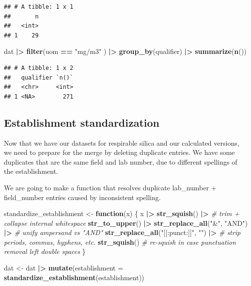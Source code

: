 \documentclass[
]{article}
\newenvironment{Shaded}{\begin{snugshade}}{\end{snugshade}}
\newcommand{\AttributeTok}[1]{\textcolor[rgb]{0.13,0.29,0.53}{#1}}
\newcommand{\CommentTok}[1]{\textcolor[rgb]{0.56,0.35,0.01}{\textit{#1}}}
\newcommand{\ControlFlowTok}[1]{\textcolor[rgb]{0.13,0.29,0.53}{\textbf{#1}}}
\newcommand{\FunctionTok}[1]{\textcolor[rgb]{0.13,0.29,0.53}{\textbf{#1}}}
\newcommand{\NormalTok}[1]{#1}
\newcommand{\OtherTok}[1]{\textcolor[rgb]{0.56,0.35,0.01}{#1}}
\newcommand{\SpecialCharTok}[1]{\textcolor[rgb]{0.81,0.36,0.00}{\textbf{#1}}}
\newcommand{\StringTok}[1]{\textcolor[rgb]{0.31,0.60,0.02}{#1}}
\begin{document}
\begin{verbatim}
## # A tibble: 1 x 1
##       n
##   <int>
## 1    29
\end{verbatim}

\begin{Shaded}
\begin{Highlighting}[]
\NormalTok{dat }\SpecialCharTok{|\textgreater{}} 
  \FunctionTok{filter}\NormalTok{(uom }\SpecialCharTok{==} \StringTok{"mg/m3"}\NormalTok{ ) }\SpecialCharTok{|\textgreater{}} 
  \FunctionTok{group\_by}\NormalTok{(qualifier) }\SpecialCharTok{|\textgreater{}} 
  \FunctionTok{summarize}\NormalTok{(}\FunctionTok{n}\NormalTok{())}
\end{Highlighting}
\end{Shaded}

\begin{verbatim}
## # A tibble: 1 x 2
##   qualifier `n()`
##   <chr>     <int>
## 1 <NA>        271
\end{verbatim}

\subsection{Establishment
standardization}\label{establishment-standardization}

Now that we have our datasets for respirable silica and our calculated
versions, we need to prepare for the merge by deleting duplicate
entries. We have some duplicates that are the same field and lab number,
due to different spellings of the establishment.

We are going to make a function that resolves duplicate lab\_number +
field\_number entries caused by inconsistent spelling.

\begin{Shaded}
\begin{Highlighting}[]
\NormalTok{standardize\_establishment }\OtherTok{\textless{}{-}} \ControlFlowTok{function}\NormalTok{(x) \{}
\NormalTok{  x }\SpecialCharTok{|\textgreater{}}
    \FunctionTok{str\_squish}\NormalTok{() }\SpecialCharTok{|\textgreater{}}                          \CommentTok{\# trim + collapse internal whitespace}
    \FunctionTok{str\_to\_upper}\NormalTok{() }\SpecialCharTok{|\textgreater{}}
    \FunctionTok{str\_replace\_all}\NormalTok{(}\StringTok{"\&"}\NormalTok{, }\StringTok{"AND"}\NormalTok{) }\SpecialCharTok{|\textgreater{}}           \CommentTok{\# unify ampersand vs "AND"}
    \FunctionTok{str\_replace\_all}\NormalTok{(}\StringTok{"[[:punct:]]"}\NormalTok{, }\StringTok{""}\NormalTok{) }\SpecialCharTok{|\textgreater{}}    \CommentTok{\# strip periods, commas, hyphens, etc.}
    \FunctionTok{str\_squish}\NormalTok{()                             }\CommentTok{\# re{-}squish in case punctuation removal left double spaces}
\NormalTok{\} }


\NormalTok{dat }\OtherTok{\textless{}{-}}\NormalTok{ dat }\SpecialCharTok{|\textgreater{}} \FunctionTok{mutate}\NormalTok{(}\AttributeTok{establishment =} \FunctionTok{standardize\_establishment}\NormalTok{(establishment)) }
\end{Highlighting}
\end{Shaded}
\end{document}

